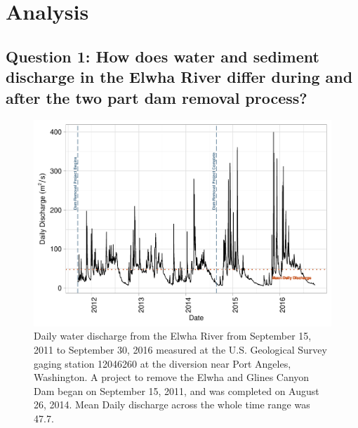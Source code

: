\documentclass[12pt,]{article}
\begin{document}
\newpage

\hypertarget{analysis}{%
\section{Analysis}\label{analysis}}

\hypertarget{question-1-how-does-water-and-sediment-discharge-in-the-elwha-river-differ-during-and-after-the-two-part-dam-removal-process}{%
\subsection{Question 1: How does water and sediment discharge in the
Elwha River differ during and after the two part dam removal
process?}\label{question-1-how-does-water-and-sediment-discharge-in-the-elwha-river-differ-during-and-after-the-two-part-dam-removal-process}}

\begin{figure}
\centering
\includegraphics{Mason_ENV872_ProjectFinal_files/figure-latex/Intro to Question Figure 1-1.pdf}
\caption{Daily water discharge from the Elwha River from September 15,
2011 to September 30, 2016 measured at the U.S. Geological Survey gaging
station 12046260 at the diversion near Port Angeles, Washington. A
project to remove the Elwha and Glines Canyon Dam began on September 15,
2011, and was completed on August 26, 2014. Mean Daily discharge across
the whole time range was 47.7.}
\end{figure}
\end{document}
